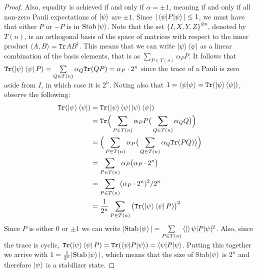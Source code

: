 \documentclass[12pt]{dalthesis}
\begin{document}
\begin{proof}
Also, equality is achieved if and only if $\alpha = \pm 1$,  meaning if and only if all non-zero Pauli expectations of $\ket{\psi}$ are $\pm 1$. Since $|\braket{\psi |P| \psi}| \leq 1$, we must have that either $P$ or $-P$ is in $\mathrm{Stab}\ket{\psi}$. Note that the set $\{ I, X, Y, Z \}^{\otimes n}$, denoted by $T(n)$, is an orthogonal basis of the space of matrices with respect to the inner product $\langle A, B \rangle = \texttt{Tr} AB^{\dag}$. This means that we can write $\ket{\psi} \bra{\psi}$ as a linear combination of the basis elements, that is as $\sum\limits_{P\in T(n)} \alpha_PP $. It follows that $\texttt{Tr}(\ket{\psi}\bra{\psi}P) = \sum\limits_{Q\in T(n)} \alpha_Q \texttt{Tr}(QP) = \alpha_P \cdot 2^n$ since the trace of a Pauli is zero aside from $I$, in which case it is $2^n$. Noting also that $1 = \braket{\psi |\psi} = \texttt{Tr}(\ket{\psi}\bra{\psi})$, observe the following:
\begin{equation}
\begin{split}
\texttt{Tr}(\ket{\psi}\bra{\psi}) & = \texttt{Tr}(\ket{\psi}\bra{\psi}\ket{\psi}\bra{\psi}) \\
& = \texttt{Tr} \Big( \sum\limits_{P\in T(n)} \alpha_PP \big( \sum\limits_{Q\in T(n)} \alpha_QQ \big) \Big) \\
& =  \Big( \sum\limits_{P\in T(n)} \alpha_P \big( \sum\limits_{Q\in T(n)} \alpha_Q \texttt{Tr}(PQ) \big) \Big) \\
& = \sum\limits_{P\in T(n)} \alpha_P \big( \alpha_P \cdot 2^n \big) \\
& = \sum\limits_{P\in T(n)} (\alpha_P \cdot 2^n)^2/2^n \\
& = \frac{1}{2^n} \sum\limits_{P\in T(n)} \big( \texttt{Tr}(\ket{\psi}\bra{\psi}P) \big)^2
\end{split}
\end{equation}
Since $P$ is either $0$ or $\pm 1$ we can write $|\mathrm{Stab}\ket{\psi}| = \sum\limits_{P\in T(n)} \braket|{\psi |P|\psi}|^2$. Also, since the trace is cyclic, $\texttt{Tr}(\ket{\psi}\bra{\psi}P) = \texttt{Tr}(\braket{\psi | P | \psi}) = \braket{\psi | P | \psi}$. Putting this together we arrive with $1 = \frac{1}{2^n} |\mathrm{Stab}\ket{\psi}|$, which means that the size of Stab$\ket{\psi}$ is $2^n$ and therefore $\ket{\psi}$ is a stabilizer state.
\end{proof}
\end{document}
